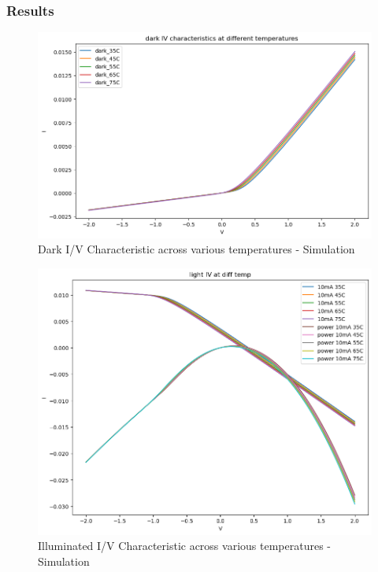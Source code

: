 \documentclass[a4paper]{article}
\begin{document}
\subsubsection{Results}
\begin{figure}[h!]
    \centering
    \includegraphics[width=0.9\linewidth]{Lab_5/Pre_Lab/Dark_IV.png}
    \caption{Dark I/V Characteristic across various temperatures - Simulation}
\end{figure}

\begin{figure}[h!]
    \centering
    \includegraphics[width=0.9\linewidth]{Lab_5/Pre_Lab/Illuminated_IV.png}
    \caption{Illuminated I/V Characteristic across various temperatures - Simulation}
\end{figure}

\newpage
\hypertarget{page3}{}
\end{document}
